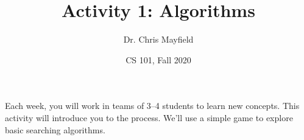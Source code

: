 \documentclass[12pt]{article}
\title{Activity 1: Algorithms}
\author{Dr. Chris Mayfield}
\date{CS 101, Fall 2020}
\begin{document}
\maketitle

Each week, you will work in teams of 3--4 students to learn new concepts.
This activity will introduce you to the process.
We'll use a simple game to explore basic searching algorithms.

%

\end{document}
